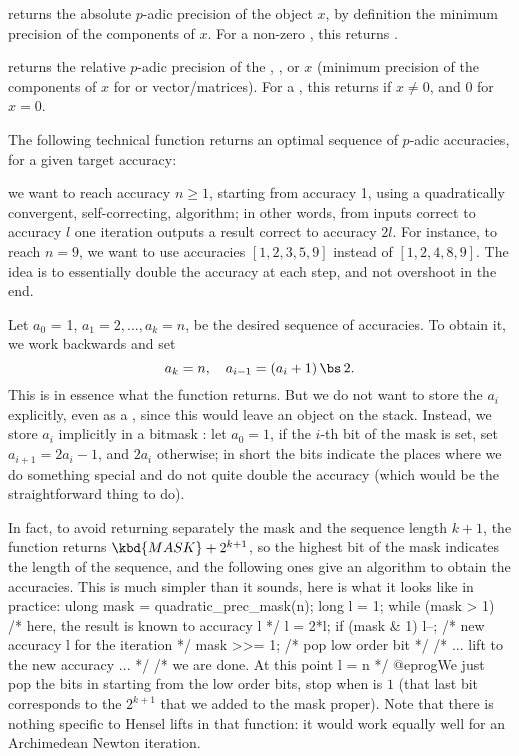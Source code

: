  returns the absolute $p$-adic precision of
the object $x$, by definition the minimum precision of the components of $x$.
For a non-zero , this returns .

 returns the relative $p$-adic
precision of the , , or  $x$ (minimum precision
of the components of $x$ for  or vector/matrices).
For a , this returns  if $x\neq0$, and $0$ for $x=0$.


The following technical function returns an optimal sequence of $p$-adic
accuracies, for a given target accuracy:

 we want to reach accuracy
$n\geq 1$, starting from accuracy 1, using a quadratically convergent,
self-correcting, algorithm; in other words, from inputs correct to accuracy
$l$ one iteration outputs a result correct to accuracy $2l$.
For instance, to reach $n = 9$, we want to use accuracies
$[1,2,3,5,9]$ instead of $[1,2,4,8,9]$. The idea is to essentially double
the accuracy at each step, and not overshoot in the end.

Let $a_0$ = 1, $a_1 = 2, \ldots, a_k = n$, be the desired sequence of
accuracies. To obtain it, we work backwards and set
$$ a_k = n,\quad a_{i-1} = (a_i + 1)\,\bs\, 2.$$
This is in essence what the function returns.
But we do not want to store the $a_i$ explicitly, even as a ,
since this would leave an object on the stack. Instead, we store $a_i$
implicitly in a bitmask : let $a_0 = 1$, if the $i$-th bit of the
mask is set, set $a_{i+1} = 2a_i - 1$, and $2a_i$ otherwise; in short the
bits indicate the places where we do something special and do not quite
double the accuracy (which would be the straightforward thing to do).

In fact, to avoid returning separately the mask and the sequence length
$k+1$, the function returns $\kbd{MASK} + 2^{k+1}$, so the highest bit of
the mask indicates the length of the sequence, and the following ones give
an algorithm to obtain the accuracies. This is much simpler than it sounds,
here is what it looks like in practice:
\bprog
  ulong mask = quadratic_prec_mask(n);
  long l = 1;
  while (mask > 1) {            /* here, the result is known to accuracy l */
    l = 2*l; if (mask & 1) l--; /* new accuracy l for the iteration */
    mask >>= 1;                 /* pop low order bit */
    /* ... lift to the new accuracy ... */
  }
  /* we are done. At this point l = n */
@eprog\noindent We just pop the bits in  starting from the low
order bits, stop when  is $1$ (that last bit corresponds to the
$2^{k+1}$ that we added to the mask proper). Note that there is nothing
specific to Hensel lifts in that function: it would work equally well for
an Archimedean Newton iteration.

